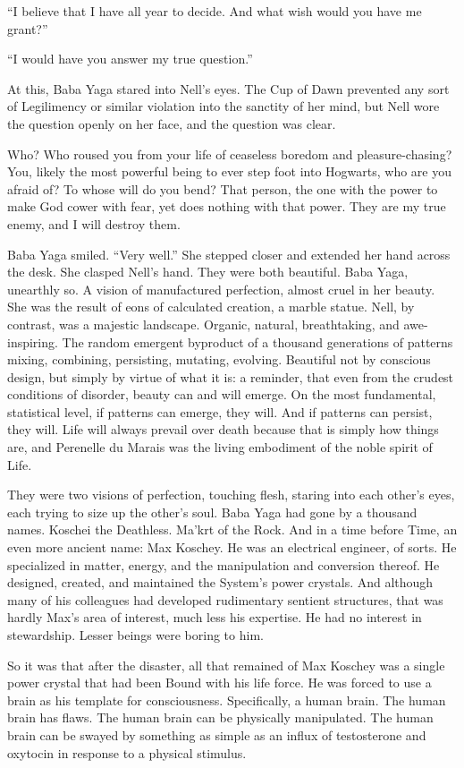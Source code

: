 “I believe that I have all year to decide. And what wish would you have me grant?”

“I would have you answer my true question.”

At this, Baba Yaga stared into Nell’s eyes. The Cup of Dawn prevented any sort of Legilimency or similar violation into the sanctity of her mind, but Nell wore the question openly on her face, and the question was clear.

Who? Who roused you from your life of ceaseless boredom and pleasure-chasing? You, likely the most powerful being to ever step foot into Hogwarts, who are you afraid of? To whose will do you bend? That person, the one with the power to make God cower with fear, yet does nothing with that power. They are my true enemy, and I will destroy them.

Baba Yaga smiled. “Very well.” She stepped closer and extended her hand across the desk. She clasped Nell’s hand. They were both beautiful. Baba Yaga, unearthly so. A vision of manufactured perfection, almost cruel in her beauty. She was the result of eons of calculated creation, a marble statue. Nell, by contrast, was a majestic landscape. Organic, natural, breathtaking, and awe-inspiring. The random emergent byproduct of a thousand generations of patterns mixing, combining, persisting, mutating, evolving. Beautiful not by conscious design, but simply by virtue of what it is: a reminder, that even from the crudest conditions of disorder, beauty can and will emerge. On the most fundamental, statistical level, if patterns can emerge, they will. And if patterns can persist, they will. Life will always prevail over death because that is simply how things are, and Perenelle du Marais was the living embodiment of the noble spirit of Life.

They were two visions of perfection, touching flesh, staring into each other’s eyes, each trying to size up the other’s soul. Baba Yaga had gone by a thousand names. Koschei the Deathless. Ma’krt of the Rock. And in a time before Time, an even more ancient name: Max Koschey. He was an electrical engineer, of sorts. He specialized in matter, energy, and the manipulation and conversion thereof. He designed, created, and maintained the System’s power crystals. And although many of his colleagues had developed rudimentary sentient structures, that was hardly Max’s area of interest, much less his expertise. He had no interest in stewardship. Lesser beings were boring to him.

So it was that after the disaster, all that remained of Max Koschey was a single power crystal that had been Bound with his life force. He was forced to use a brain as his template for consciousness. Specifically, a human brain. The human brain has flaws. The human brain can be physically manipulated. The human brain can be swayed by something as simple as an influx of testosterone and oxytocin in response to a physical stimulus.

